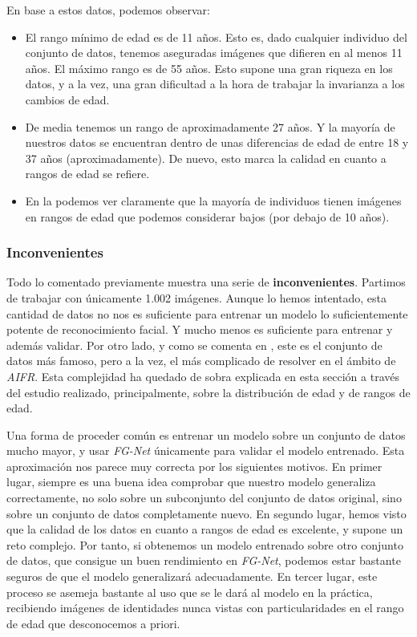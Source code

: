 En base a estos datos, podemos observar:

\begin{itemize}
    \item El rango mínimo de edad es de 11 años. Esto es, dado cualquier individuo del conjunto de datos, tenemos aseguradas imágenes que difieren en al menos 11 años. El máximo rango es de 55 años. Esto supone una gran riqueza en los datos, y a la vez, una gran dificultad a la hora de trabajar la invarianza a los cambios de edad.
    \item De media tenemos un rango de aproximadamente 27 años. Y la mayoría de nuestros datos se encuentran dentro de unas diferencias de edad de entre 18 y 37 años (aproximadamente). De nuevo, esto marca la calidad en cuanto a rangos de edad se refiere.
    \item En la  podemos ver claramente que la mayoría de individuos tienen imágenes en rangos de edad que podemos considerar bajos (por debajo de 10 años).
\end{itemize}

\subsubsection{Inconvenientes} \label{isubsubs:fgnet_inconvenientes}

Todo lo comentado previamente muestra una serie de \textbf{inconvenientes}. Partimos de trabajar con únicamente 1.002 imágenes. Aunque lo hemos intentado, esta cantidad de datos no nos es suficiente para entrenar un modelo lo suficientemente potente de reconocimiento facial. Y mucho menos es suficiente para entrenar y además validar. Por otro lado, y como se comenta en \cite{informatica:best_fgnet_model}, este es el conjunto de datos más famoso, pero a la vez, el más complicado de resolver en el ámbito de \textit{AIFR}. Esta complejidad ha quedado de sobra explicada en esta sección a través del estudio realizado, principalmente, sobre la distribución de edad y de rangos de edad.

Una forma de proceder común \cite{informatica:best_fgnet_model} es entrenar un modelo sobre un conjunto de datos mucho mayor, y usar \textit{FG-Net} únicamente para validar el modelo entrenado. Esta aproximación nos parece muy correcta por los siguientes motivos. En primer lugar, siempre es una buena idea comprobar que nuestro modelo generaliza correctamente, no solo sobre un subconjunto del conjunto de datos original, sino sobre un conjunto de datos completamente nuevo. En segundo lugar, hemos visto que la calidad de los datos en cuanto a rangos de edad es excelente, y supone un reto complejo. Por tanto, si obtenemos un modelo entrenado sobre otro conjunto de datos, que consigue un buen rendimiento en \textit{FG-Net}, podemos estar bastante seguros de que el modelo generalizará adecuadamente. En tercer lugar, este proceso se asemeja bastante al uso que se le dará al modelo en la práctica, recibiendo imágenes de identidades nunca vistas con particularidades en el rango de edad que desconocemos a priori.

